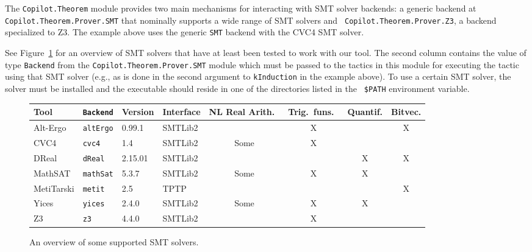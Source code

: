 The {\tt Copilot.Theorem} module provides two main mechanisms for interacting
with SMT solver backends: a generic backend at {\tt Copilot.Theorem.Prover.SMT}
that nominally supports a wide range of SMT solvers and {\tt
Copilot.Theorem.Prover.Z3}, a backend specialized to Z3. The example above uses
the generic {\tt SMT} backend with the CVC4 SMT solver.

See Figure~\ref{fig:solvers} for an overview of SMT solvers that have at least
been tested to work with our tool. The second column contains the value of type
{\tt Backend} from the {\tt Copilot.Theorem.Prover.SMT} module which must be
passed to the tactics in this module for executing the tactic using that SMT
solver (e.g., as is done in the second argument to {\tt kInduction} in the
example above). To use a certain SMT solver, the solver must be installed and
the executable should reside in one of the directories listed in the {\tt
\$PATH} environment variable.

\newcommand{\Yes}{\checkmark}
\newcommand{\No}{\textsf{X}}
\newcommand{\Some}{\textsf{Some}}

\begin{figure}
\begin{center}
\begin{tabular}{llllcccc}
Tool       & {\tt Backend} & Version & Interface & NL Real Arith.\ & Trig.\ funs.\ & Quantif. & Bitvec. \\
\toprule
Alt-Ergo   & {\tt altErgo} & 0.99.1  & SMTLib2   & \Yes{}          & \No{}         & \Yes{}      & \No{}      \\
CVC4       & {\tt cvc4}    & 1.4     & SMTLib2   & \Some{}         & \No{}         & \Yes{}      & \Yes{}     \\
DReal      & {\tt dReal}   & 2.15.01 & SMTLib2   & \Yes{}          & \Yes{}        & \No{}       & \No{}      \\
MathSAT    & {\tt mathSat} & 5.3.7   & SMTLib2   & \Some{}         & \No{}         & \No{}       & \Yes{}     \\
MetiTarski & {\tt metit}   & 2.5     & TPTP      & \Yes{}          & \Yes{}        & \Yes{}      & \No{}      \\
Yices      & {\tt yices}   & 2.4.0   & SMTLib2   & \Some{}         & \No{}         & \No{}       & \Yes{}     \\
Z3         & {\tt z3}      & 4.4.0   & SMTLib2   & \Yes{}          & \No{}         & \Yes{}      & \Yes{}     \\
\end{tabular}
\end{center}
\caption{An overview of some supported SMT solvers.}
\label{fig:solvers}
\end{figure}


